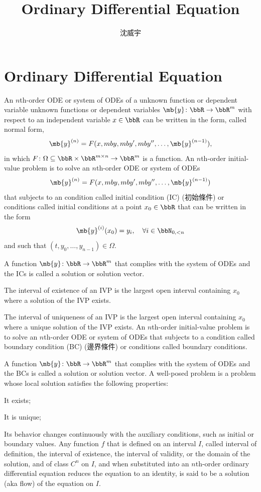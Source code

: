 \documentclass[a4paper,12pt]{report}
\begin{document}
\title{Ordinary Differential Equation}
\author{沈威宇}
\date{\temtoday}
\titletocdoc
{}
\section{Ordinary Differential Equation}
An $n$th-order ODE or system of ODEs of a unknown function or dependent variable unknown functions or dependent variables $\mb{y}\colon\bbR\to\bbR^m$ with respect to an independent variable $x\in\bbR$ can be written in the form, called normal form,
\[\mb{y}^{(n)}=F(x,mb{y},mb{y}',mb{y}'',\ldots,\mb{y}^{(n-1)}),\]
in which $F\colon\Omega\subseteq\bbR\times\bbR^{m\times n}\to\bbR^m$ is a function.
An $n$th-order initial-value problem is to solve an $n$th-order ODE or system of ODEs
\[\mb{y}^{(n)}=F(x,mb{y},mb{y}',mb{y}'',\ldots,\mb{y}^{(n-1)})\]
that subjects to an condition called initial condition (IC) (初始條件) or conditions called initial conditions at a point $x_0\in\bbR$ that can be written in the form
\[\mb{y}^{(i)}(x_0)=y_i,\quad\forall i\in\bbN_{0,<n}\]
and such that $(t,y_0,\ldots,y_{n-1})\in\Omega$.

A function $\mb{y}\colon\bbR\to\bbR^m$ that complies with the system of ODEs and the ICs is called a solution or solution vector.

The interval of existence of an IVP is the largest open interval containing $x_0$ where a solution of the IVP exists.

The interval of uniqueness of an IVP is the largest open interval containing $x_0$ where a unique solution of the IVP exists.
An $n$th-order initial-value problem is to solve an $n$th-order ODE or system of ODEs that subjects to a condition called boundary condition (BC) (邊界條件) or conditions called boundary conditions.

A function $\mb{y}\colon\bbR\to\bbR^m$ that complies with the system of ODEs and the BCs is called a solution or solution vector.
A well-posed problem is a problem whose local solution satisfies the following properties:
\bit
\item It exists;
\item It is unique;
\item Its behavior changes continuously with the auxiliary conditions, such as initial or boundary values.
\eit
{}
Any function $f$ that is defined on an interval $I$, called interval of definition, the interval of existence, the interval of validity, or the domain of the solution, and of class $C^n$ on $I$, and when substituted into an $n$th-order ordinary differential equation reduces the equation to an identity, is said to be a solution (aka flow) of the equation on $I$.
\end{document}
